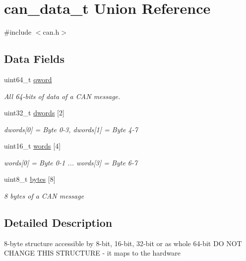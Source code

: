 \hypertarget{unioncan__data__t}{}\section{can\+\_\+data\+\_\+t Union Reference}
\label{unioncan__data__t}


{\ttfamily \#include $<$can.\+h$>$}

\subsection*{Data Fields}
\begin{DoxyCompactItemize}
\item 
uint64\+\_\+t \hyperlink{unioncan__data__t_a41667832d267ee3fd67d7b0c34054068}{qword}
\begin{DoxyCompactList}\small\item\em All 64-\/bits of data of a C\+AN message. \end{DoxyCompactList}\item 
uint32\+\_\+t \hyperlink{unioncan__data__t_a32b41652b919ee512156989478f9b993}{dwords} \mbox{[}2\mbox{]}
\begin{DoxyCompactList}\small\item\em dwords\mbox{[}0\mbox{]} = Byte 0-\/3, dwords\mbox{[}1\mbox{]} = Byte 4-\/7 \end{DoxyCompactList}\item 
uint16\+\_\+t \hyperlink{unioncan__data__t_a9631170190ce3ecad7370b651ab70b3f}{words} \mbox{[}4\mbox{]}
\begin{DoxyCompactList}\small\item\em words\mbox{[}0\mbox{]} = Byte 0-\/1 ... words\mbox{[}3\mbox{]} = Byte 6-\/7 \end{DoxyCompactList}\item 
uint8\+\_\+t \hyperlink{unioncan__data__t_a59f2f0065f03d0a30d43e0d4e1d8bca2}{bytes} \mbox{[}8\mbox{]}
\begin{DoxyCompactList}\small\item\em 8 bytes of a C\+AN message \end{DoxyCompactList}\end{DoxyCompactItemize}


\subsection{Detailed Description}
8-\/byte structure accessible by 8-\/bit, 16-\/bit, 32-\/bit or as whole 64-\/bit DO N\+OT C\+H\+A\+N\+GE T\+H\+IS S\+T\+R\+U\+C\+T\+U\+RE -\/ it maps to the hardware 

